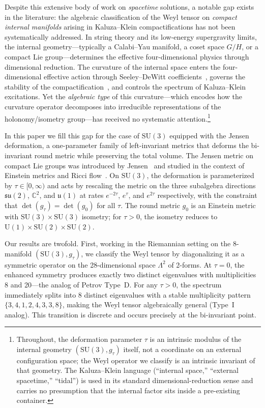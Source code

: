 \documentclass[12pt]{article}
\theoremstyle{definition}
\theoremstyle{remark}
\begin{document}
Despite this extensive body of work on \emph{spacetime} solutions, a notable gap exists in the literature: the algebraic classification of the Weyl tensor on \emph{compact internal manifolds} arising in Kaluza--Klein compactifications has not been systematically addressed.  In string theory and its low-energy supergravity limits, the internal geometry---typically a Calabi--Yau manifold, a coset space $G/H$, or a compact Lie group---determines the effective four-dimensional physics through dimensional reduction.  The curvature of the internal space enters the four-dimensional effective action through Seeley--DeWitt coefficients~\cite{Gilkey1975,VanSuijlekom2015}, governs the stability of the compactification~\cite{Koiso1980,WittenKKinstability1982}, and controls the spectrum of Kaluza--Klein excitations.  Yet the \emph{algebraic type} of this curvature---which encodes how the curvature operator decomposes into irreducible representations of the holonomy/isometry group---has received no systematic attention.\footnote{Throughout, the deformation parameter $\tau$ is an intrinsic modulus of the internal geometry $(\mathrm{SU}(3),g_\tau)$ itself, not a coordinate on an external configuration space; the Weyl operator we classify is an intrinsic invariant of that geometry. The Kaluza--Klein language (``internal space,'' ``external spacetime,'' ``tidal'') is used in its standard dimensional-reduction sense and carries no presumption that the internal factor sits inside a pre-existing container.}

In this paper we fill this gap for the case of $\mathrm{SU}(3)$ equipped with the Jensen deformation, a one-parameter family of left-invariant metrics that deforms the bi-invariant round metric while preserving the total volume.  The Jensen metric on compact Lie groups was introduced by Jensen~\cite{Jensen1973} and studied in the context of Einstein metrics and Ricci flow~\cite{Milnor1976,BohmWilking2008}.  On $\mathrm{SU}(3)$, the deformation is parameterized by $\tau\in[0,\infty)$ and acts by rescaling the metric on the three subalgebra directions $\mathfrak{su}(2)$, $\mathbb{C}^2$, and $\mathfrak{u}(1)$ at rates $e^{-2\tau}$, $e^{\tau}$, and $e^{2\tau}$ respectively, with the constraint that $\det(g_\tau)=\det(g_0)$ for all $\tau$.  The round metric $g_0$ is an Einstein metric with $\mathrm{SU}(3)\times\mathrm{SU}(3)$ isometry; for $\tau>0$, the isometry reduces to $\mathrm{U}(1)\times\mathrm{SU}(2)\times\mathrm{SU}(2)$.

Our results are twofold.  First, working in the Riemannian setting on the 8-manifold $(\mathrm{SU}(3),g_\tau)$, we classify the Weyl tensor by diagonalizing it as a symmetric operator on the 28-dimensional space $\Lambda^2$ of 2-forms.  At $\tau=0$, the enhanced symmetry produces exactly two distinct eigenvalues with multiplicities 8 and 20---the analog of Petrov Type~D.  For any $\tau>0$, the spectrum immediately splits into 8 distinct eigenvalues with a stable multiplicity pattern $\{3,4,1,2,4,3,3,8\}$, making the Weyl tensor algebraically general (Type~I analog).  This transition is discrete and occurs precisely at the bi-invariant point.
\end{document}
